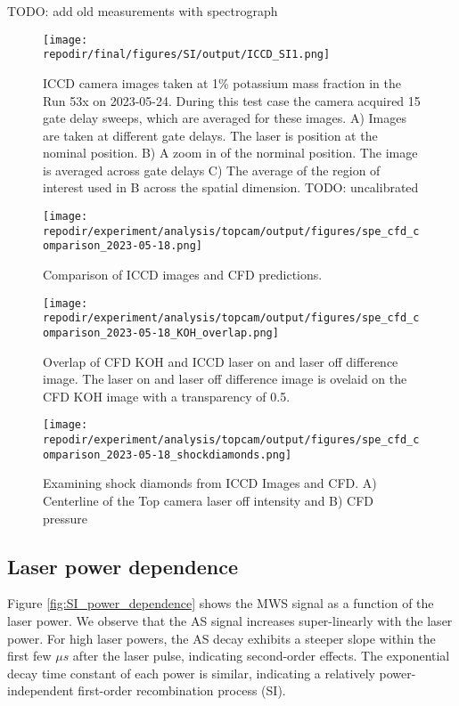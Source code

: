 TODO: add old measurements with spectrograph

\begin{figure}[]
\centering
\texttt{[image: \\repodir/final/figures/SI/output/ICCD\_SI1.png]}
\caption{ICCD camera images taken at 1\% potassium mass fraction in the Run 53x on 2023-05-24. During this test case the camera acquired 15 gate delay sweeps, which are averaged for these images. A) Images are taken at different gate delays. The laser is position at the nominal position. B) A zoom in of the norminal position. The image is averaged across gate delays C) The average of the region of interest used in B across the spatial dimension. TODO: uncalibrated}
\label{fig:SI_536_iccd}
\end{figure}


\begin{figure}[]
\centering
\texttt{[image: \\repodir/experiment/analysis/topcam/output/figures/spe\_cfd\_comparison\_2023-05-18.png]}
\caption{Comparison of ICCD images and CFD predictions. }
\label{fig:SI_iccd_cfd_comparison}
\end{figure}


\begin{figure}[]
\centering
\texttt{[image: \\repodir/experiment/analysis/topcam/output/figures/spe\_cfd\_comparison\_2023-05-18\_KOH\_overlap.png]}
\caption{Overlap of CFD KOH and ICCD laser on and laser off difference image. The laser on and laser off difference image is ovelaid on the CFD KOH image with a transparency of 0.5. }
\label{fig:SI_iccd_cfd_comparison_KOH_overlap}
\end{figure}

\begin{figure}
    \centering
    \texttt{[image: \\repodir/experiment/analysis/topcam/output/figures/spe\_cfd\_comparison\_2023-05-18\_shockdiamonds.png]} 
    \caption{Examining shock diamonds from ICCD Images and CFD. A) Centerline of the Top camera laser off intensity and B) CFD pressure}
    \label{fig:SI_iccd_cfd_comparison_KOH}
\end{figure}

\subsection{Laser power dependence}

Figure \ref{fig:SI_power_dependence} shows the MWS signal as a function of the laser power. We observe that the AS signal increases super-linearly with the laser power. For high laser powers, the AS decay exhibits a steeper slope within the first few $\mu s$ after the laser pulse, indicating second-order effects. The exponential decay time constant of each power is similar, indicating a relatively power-independent first-order recombination process (SI).

